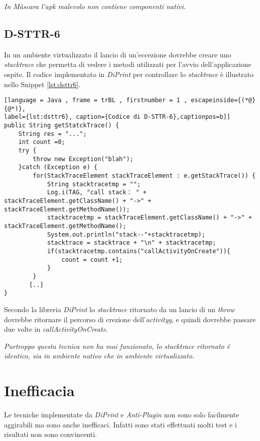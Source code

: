 \emph{In Màscara l'apk malevolo non contiene componenti nativi.}

\newpage

\subsection*{D-STTR-6}
\label{d-sttr-6}

In un ambiente virtualizzato il lancio di un'eccezione dovrebbe creare uno \emph{stacktrace} che permetta di vedere i metodi utilizzati per l'avvio dell'applicazione ospite.
Il codice implementato in \emph{DiPrint} per controllare lo \emph{stacktrace} è illustrato nello Snippet \ref{lst:dsttr6}.

\begin{lstlisting}[language = Java , frame = trBL , firstnumber = 1 , escapeinside={(*@}{@*)},
label={lst:dsttr6}, caption={Codice di D-STTR-6},captionpos=b]]
public String getStatckTrace() {
    String res = "...";
    int count =0;
    try {
        throw new Exception("blah");
    }catch (Exception e) {
        for(StackTraceElement stackTraceElement : e.getStackTrace()) {
            String stacktracetmp = "";
            Log.i(TAG, "call stack： " + stackTraceElement.getClassName() + "->" + stackTraceElement.getMethodName());
            stacktracetmp = stackTraceElement.getClassName() + "->" + stackTraceElement.getMethodName();
            System.out.println("stack--"+stacktracetmp);
            stacktrace = stacktrace + "\n" + stacktracetmp;
            if(stacktracetmp.contains("callActivityOnCreate")){
                count = count +1;
            }
        }
       [..]
}

\end{lstlisting}

Secondo la libreria \emph{DiPrint} lo \emph{stacktrace} ritornato da un lancio di un \emph{throw} dovrebbe ritornare il percorso di crezione dell'\emph{\gls{activityg}}, e quindi dovrebbe passare due volte in \emph{callActivityOnCreate}.

\emph{Purtroppo questa tecnica non ha mai funzionato, lo stacktrace ritornato è identico, sia in ambiente nativo che in ambiente virtualizzato.}

\newpage

\section{Inefficacia}

Le tecniche implementate da \emph{DiPrint} e \emph{Anti-Plugin} non sono solo facilmente aggirabili ma sono anche inefficaci. Infatti sono stati effettuati molti test e i risultati non sono convincenti.


